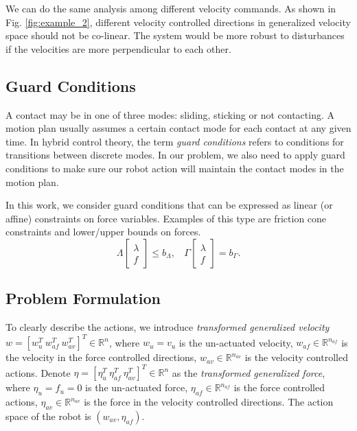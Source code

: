 We can do the same analysis among different velocity commands. As shown in Fig. \ref{fig:example_2}, different velocity controlled directions in generalized velocity space should not be co-linear. The system would be more robust to disturbances if the velocities are more perpendicular to each other.
\subsection{Guard Conditions} %
\label{sub:guard_conditions}
A contact may be in one of three modes: sliding, sticking or not contacting. A motion plan usually assumes a certain contact mode for each contact at any given time.
In hybrid control theory, the term \textit{guard conditions} refers to conditions for transitions between discrete modes. In our problem, we also need to apply guard conditions to make sure our robot action will maintain the contact modes in the motion plan.

In this work, we consider guard conditions that can be expressed as linear (or affine) constraints on force variables. Examples of this type are friction cone constraints and lower/upper bounds on forces.
\begin{equation}
\label{eq:guard_conditions}
	\Lambda\left[ {\begin{array}{*{20}{c}}
	\lambda\\
	f
	\end{array}} \right] \le {b_\Lambda},\ \ \ \ \Gamma\left[ {\begin{array}{*{20}{c}}
    \lambda\\
    f
    \end{array}} \right] = {b_\Gamma}.
\end{equation}

\subsection{Problem Formulation} %
\label{sub:problem_formulation}
To clearly describe the actions, we introduce \textit{transformed generalized velocity} $w=[w^T_u\ w^T_{af}\ w^T_{av}]^T\in\mathbb{R}^{n}$, where $w_u=v_u$ is the un-actuated velocity, $w_{af}\in \mathbb{R}^{n_{af}}$ is the velocity in the force controlled directions, $w_{av}\in\mathbb{R}^{n_{av}}$ is the velocity controlled actions. Denote $\eta=[\eta^T_u\ \eta^T_{af}\ \eta^T_{av}]^T\in\mathbb{R}^{n}$ as the \textit{transformed generalized force}, where $\eta_u=f_u=0$ is the un-actuated force, $\eta_{af}\in \mathbb{R}^{n_{af}}$ is the force controlled actions, $\eta_{av}\in\mathbb{R}^{n_{av}}$ is the force in the velocity controlled directions. The action space of the robot is $(w_{av},\eta_{af})$.

